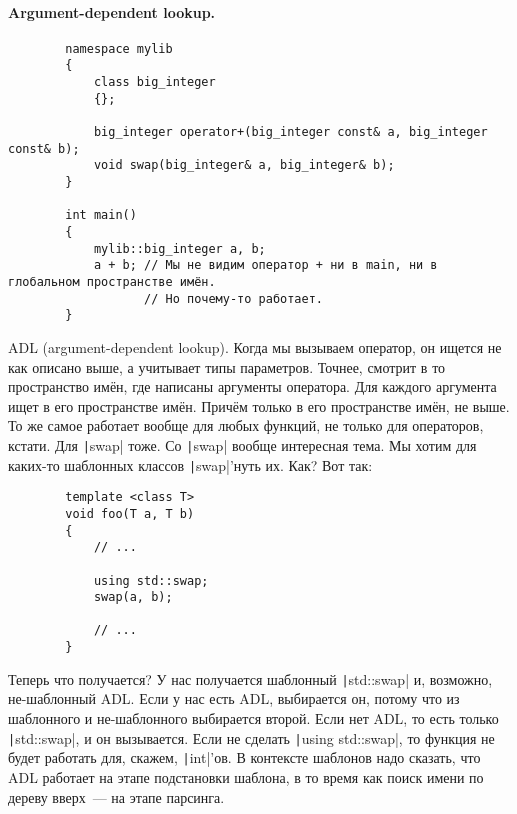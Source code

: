 \documentclass{article}
\begin{document}
    \paragraph{Argument-dependent lookup.}
    \begin{verbatim}
        namespace mylib
        {
            class big_integer
            {};

            big_integer operator+(big_integer const& a, big_integer const& b);
            void swap(big_integer& a, big_integer& b);
        }

        int main()
        {
            mylib::big_integer a, b;
            a + b; // Мы не видим оператор + ни в main, ни в глобальном пространстве имён.
                   // Но почему-то работает.
        }
    \end{verbatim}
    ADL (argument-dependent lookup). Когда мы вызываем оператор, он ищется не как описано выше, а учитывает типы параметров. Точнее, смотрит в то пространство имён, где написаны аргументы оператора. Для каждого аргумента ищет в его пространстве имён. Причём только в его пространстве имён, не выше.\\
    То же самое работает вообще для любых функций, не только для операторов, кстати. Для \texttt|swap| тоже. Со \texttt|swap| вообще интересная тема. Мы хотим для каких-то шаблонных классов \texttt|swap|'нуть их. Как? Вот так:
    \begin{verbatim}
        template <class T>
        void foo(T a, T b)
        {
            // ...

            using std::swap;
            swap(a, b);

            // ...
        }
    \end{verbatim}
    Теперь что получается? У нас получается шаблонный \texttt|std::swap| и, возможно, не-шаблонный ADL. Если у нас есть ADL, выбирается он, потому что из шаблонного и не-шаблонного выбирается второй. Если нет ADL, то есть только \texttt|std::swap|, и он вызывается. Если не сделать \texttt|using std::swap|, то функция не будет работать для, скажем, \texttt|int|'ов.
    В контексте шаблонов надо сказать, что ADL работает на этапе подстановки шаблона, в то время как поиск имени по дереву вверх~--- на этапе парсинга.
\end{document}
